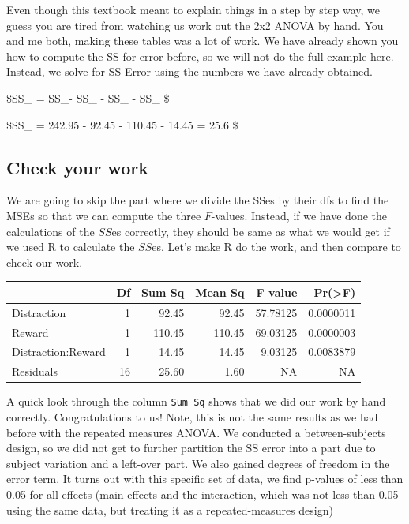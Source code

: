 \documentclass[
]{book}
\begin{document}
Even though this textbook meant to explain things in a step by step way, we guess you are tired from watching us work out the 2x2 ANOVA by hand. You and me both, making these tables was a lot of work. We have already shown you how to compute the SS for error before, so we will not do the full example here. Instead, we solve for SS Error using the numbers we have already obtained.

\$SS\_ = SS\_- SS\_ - SS\_ - SS\_ \$

\$SS\_ = 242.95 - 92.45 - 110.45 - 14.45 = 25.6 \$

\subsection{Check your work}\label{check-your-work}

We are going to skip the part where we divide the SSes by their dfs to find the MSEs so that we can compute the three \(F\)-values. Instead, if we have done the calculations of the \(SS\)es correctly, they should be same as what we would get if we used R to calculate the \(SS\)es. Let's make R do the work, and then compare to check our work.

\begin{tabular}{l|r|r|r|r|r}
\hline
  & Df & Sum Sq & Mean Sq & F value & Pr(>F)\\
\hline
Distraction & 1 & 92.45 & 92.45 & 57.78125 & 0.0000011\\
\hline
Reward & 1 & 110.45 & 110.45 & 69.03125 & 0.0000003\\
\hline
Distraction:Reward & 1 & 14.45 & 14.45 & 9.03125 & 0.0083879\\
\hline
Residuals & 16 & 25.60 & 1.60 & NA & NA\\
\hline
\end{tabular}

A quick look through the column \texttt{Sum\ Sq} shows that we did our work by hand correctly. Congratulations to us! Note, this is not the same results as we had before with the repeated measures ANOVA. We conducted a between-subjects design, so we did not get to further partition the SS error into a part due to subject variation and a left-over part. We also gained degrees of freedom in the error term. It turns out with this specific set of data, we find p-values of less than 0.05 for all effects (main effects and the interaction, which was not less than 0.05 using the same data, but treating it as a repeated-measures design)
\end{document}
